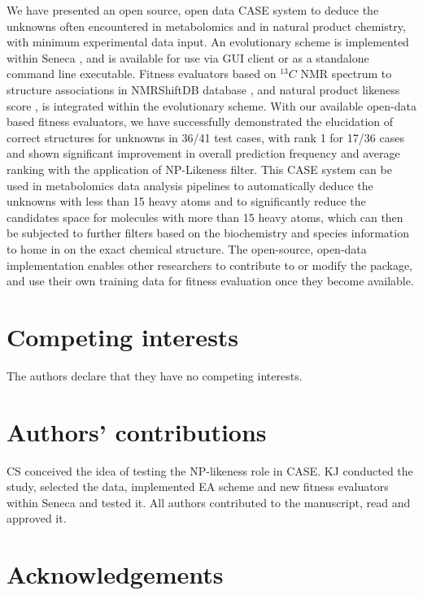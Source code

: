 \documentclass[10pt]{bmc_article}
\newenvironment{bmcformat}{\begin{raggedright}\baselineskip20pt\sloppy\setboolean{publ}{false}}{\end{raggedright}\baselineskip20pt\sloppy}
\begin{document}
\begin{bmcformat}
We have presented an open source, open data CASE system to deduce the unknowns often encountered in metabolomics and in natural product chemistry, with minimum experimental data input. 
An evolutionary scheme is implemented within Seneca \cite{Steinbeck}, and is available for use via GUI client or as a standalone command line executable. Fitness evaluators based on $^{13}C$ NMR spectrum to structure associations in NMRShiftDB database \cite{Kuhn}, and natural product likeness score \cite{Jayaseelan}, is integrated within the evolutionary scheme. With our available open-data based fitness evaluators, we have successfully demonstrated the elucidation of correct structures for unknowns in 36/41 test cases, with rank 1 for 17/36 cases and shown significant improvement in overall prediction frequency and average ranking with the application of NP-Likeness filter. This CASE system can be used in metabolomics data analysis pipelines to automatically deduce the unknowns with less than 15 heavy atoms and to significantly reduce the candidates space for molecules with more than 15 heavy atoms, which can then be subjected to further filters based on the biochemistry and species information to home in on the exact chemical structure. The open-source, open-data implementation enables other researchers to contribute to or modify the package, and use their own training data for fitness evaluation once they become available.

    
\section*{Competing interests}

The authors declare that they have no competing interests.

\section*{Authors' contributions}

CS conceived the idea of testing the NP-likeness role in CASE. KJ conducted the study, selected the data, implemented EA scheme and new fitness evaluators within Seneca and tested it. All authors contributed to the manuscript, read and approved it. 

\section*{Acknowledgements}


\end{bmcformat}
\end{document}
